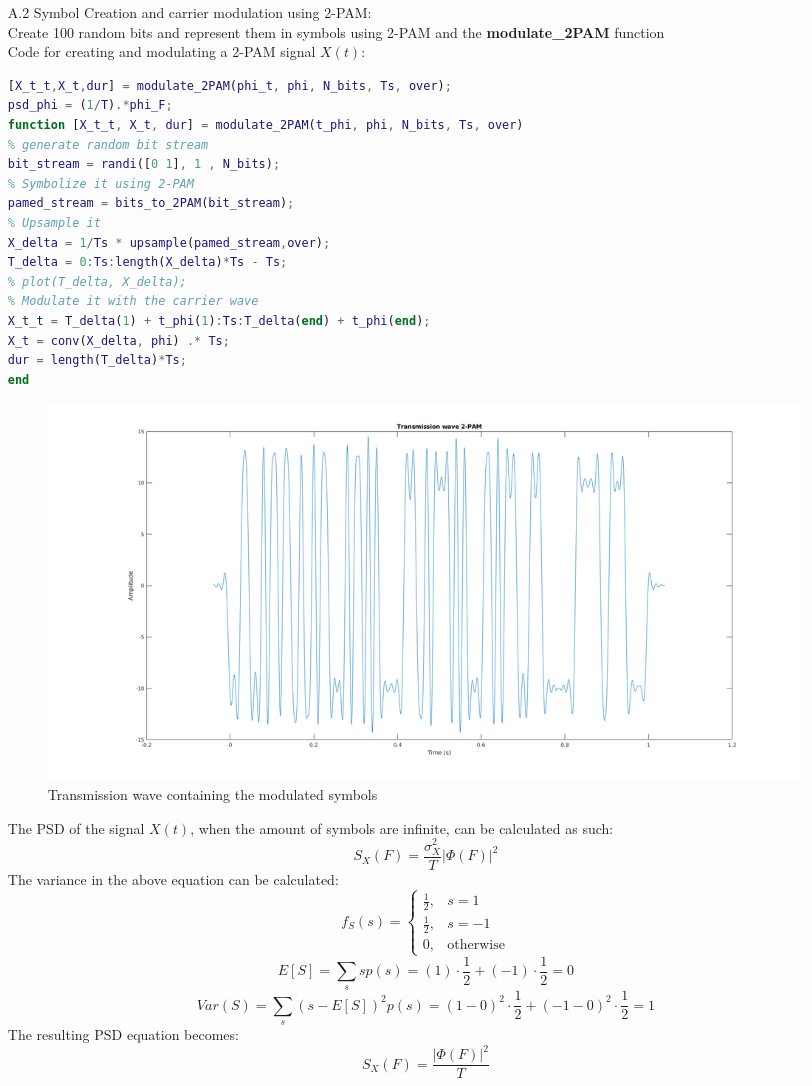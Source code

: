 \documentclass[12pt, a4paper]{article}
\begin{document}
\begin{enumerate}
\begin{enumerate}
        \item[A.2] Symbol Creation and carrier modulation using 2-PAM:\\
        Create 100 random bits and represent them in symbols using 2-PAM and the \textbf{modulate\_2PAM} function\\
        Code for creating and modulating a 2-PAM signal \(X(t)\):
        \begin{lstlisting}[language=MATLAB]
[X_t_t,X_t,dur] = modulate_2PAM(phi_t, phi, N_bits, Ts, over);
psd_phi = (1/T).*phi_F;
function [X_t_t, X_t, dur] = modulate_2PAM(t_phi, phi, N_bits, Ts, over)
% generate random bit stream
bit_stream = randi([0 1], 1 , N_bits);
% Symbolize it using 2-PAM
pamed_stream = bits_to_2PAM(bit_stream);
% Upsample it
X_delta = 1/Ts * upsample(pamed_stream,over);
T_delta = 0:Ts:length(X_delta)*Ts - Ts;
% plot(T_delta, X_delta);
% Modulate it with the carrier wave
X_t_t = T_delta(1) + t_phi(1):Ts:T_delta(end) + t_phi(end);
X_t = conv(X_delta, phi) .* Ts;
dur = length(T_delta)*Ts;
end	
    \end{lstlisting}

        \begin{figure}[H]
            \centering
            \noindent\includegraphics[width=\textwidth]{TX_2PAM.png}
            \caption{Transmission wave containing the modulated symbols}
        \end{figure}
        The PSD of the signal \(X(t)\), when the amount of symbols are infinite, can be calculated as such:
        \[S_X(F) = \frac{\sigma_X^2}{T} |\Phi(F)|^2 \]
        The variance in the above equation can be calculated:
        \[f_{S}(s) = \begin{cases} 
        	\frac{1}{2}, & s = 1 \\
        	\frac{1}{2}, & s = -1 \\
        	0, & \text{otherwise}
        \end{cases}
        \]
        \[E[S] = \sum_{s}sp(s) = (1)\cdot\frac{1}{2} + (-1)\cdot\frac{1}{2} = 0\]
        \[Var(S) = \sum_{s}(s-E[S])^2p(s) = (1 - 0)^2\cdot\frac{1}{2} + (-1 - 0)^2\cdot\frac{1}{2} = 1 \]
        The resulting PSD equation becomes:
        \[S_X(F) = \frac{|\Phi(F)|^2}{T} \]


\end{enumerate}
\end{enumerate}
\end{document}
